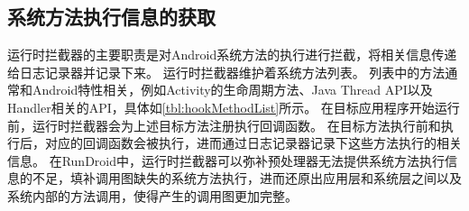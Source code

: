 \subsection{系统方法执行信息的获取}%



运行时拦截器的主要职责是对Android系统方法的执行进行拦截，将相关信息传递给日志记录器并记录下来。
运行时拦截器维护着系统方法列表。
列表中的方法通常和Android特性相关，例如Activity的生命周期方法、Java Thread API以及Handler相关的API，具体如\autoref{tbl:hookMethodList}所示。
在目标应用程序开始运行前，运行时拦截器会为上述目标方法注册执行回调函数。
在目标方法执行前和执行后，对应的回调函数会被执行，进而通过日志记录器记录下这些方法执行的相关信息。
在RunDroid中，运行时拦截器可以弥补预处理器无法提供系统方法执行信息的不足，填补调用图缺失的系统方法执行，进而还原出应用层和系统层之间以及系统内部的方法调用，使得产生的调用图更加完整。



